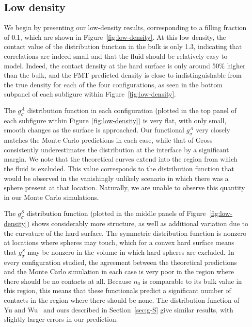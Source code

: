 \subsection{Low density}

We begin by presenting our low-density results, corresponding to a
filling fraction of 0.1, which are shown in
Figure~\ref{fig:low-density}.  At this low density,
the contact value of the distribution function in the bulk is only 1.3,
indicating that correlations are indeed small and that the fluid should be
relatively easy to model.  Indeed, the contact density at the hard
surface is only around 50\% higher than the bulk, and the FMT
predicted density is close to indistinguishable from the true
density for each of the four configurations, as seen in the bottom
subpanel of each subfigure within Figure~\ref{fig:low-density}.

The $g_\sigma^A$ distribution function in each configuration (plotted
in the top panel of each subfigure within
Figure~\ref{fig:low-density}) is very flat, with only small, smooth
changes as the surface is approached.  Our functional $g_\sigma^A$
very closely matches the Monte Carlo predictions in each case, while
that of Gross consistently underestimates the distribution at the
interface by a significant margin.  We note that the theoretical
curves extend into the region from which the fluid is excluded.  This
value corresponds to the distribution function that would be observed
in the vanishingly unlikely scenario in which there was a sphere
present at that location.  Naturally, we are unable to observe this
quantity in our Monte Carlo simulations.

The $g_\sigma^S$ distribution function (plotted
in the middle panels of Figure~\ref{fig:low-density}) shows considerably more
structure, as well as additional variation due to the curvature of the
hard surface.  The symmetric distribution function is nonzero at
locations where spheres may touch, which for a convex hard surface
means that $g_\sigma^S$ may be nonzero in the volume in which hard
spheres are excluded.  In every configuration studied, the agreement
between the theoretical predictions and the Monte Carlo simulation in
each case is very poor in the region where there should be no contacts
at all.  Because $n_0$ is comparable to its bulk value in this region,
this means that these functionals predict a significant number of
contacts in the region where there should be none.  The distribution
function of Yu and Wu~\cite{yu2002fmt-dft-inhomogeneous-associating}
and ours described in Section~\ref{sec:g-S} give similar results, with
slightly larger errors in our prediction.

